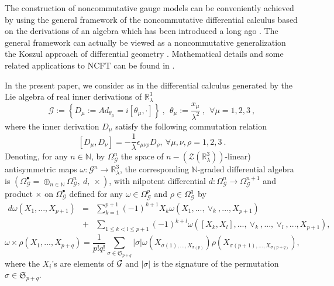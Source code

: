 \documentclass[a4paper,11pt,twoside]{article}
\numberwithin{equation}{section}
\theoremstyle{nonumberplain}
\newcounter{and}
\begin{document}
The construction of noncommutative gauge models can be conveniently achieved by using the general framework of the noncommutative differential calculus based on the derivations of an algebra which has been introduced a long ago \cite{mdv88-99}. The general framework can actually be viewed as a noncommutative generalization the Koszul approach of differential geometry \cite{koszul}. Mathematical details and some related applications to NCFT can be found in \cite{cgmw-20}. \par 
In the present paper, we consider as in \cite{gervitwal-13} the differential calculus generated by the Lie algebra of real inner derivations of $\mathbb{R}^3_\lambda$%
%
\begin{equation}
\mathcal{G} := \left\{D_\mu:= Ad_{\theta_\mu}= i \left[\theta_\mu, \cdot\right]\right\} \ ,  \ \ \theta_\mu := \frac{x_\mu}{\lambda^2} \ , \ \ \forall \mu = 1,2,3 \ , \label{inv-form-conn}
\end{equation}
%
where the inner derivation $D_\mu$ satisfy the following commutation relation%
%
\begin{equation}
\left[D_\mu,D_\nu\right] = -\frac{1}{\lambda} \epsilon_{\mu\nu\rho} D_\rho,\ \forall \mu,\nu,\rho = 1,2,3 \ . \label{Der}
\end{equation}
%
Denoting, for any $n\in\mathbb{N}$, by $\Omega^n_\mathcal{G}$ the space of $n-(\mathcal{Z}(\mathbb{R}^3_\lambda))$-linear) antisymmetric maps $\omega:\mathcal{G}^n\to\mathbb{R}^3_\lambda$, the corresponding $\mathbb{N}$-graded differential algebra is $(\Omega_\mathcal{G}^\bullet = \oplus_{n\in\mathbb{N}} \Omega^n_\mathcal{G},\ d,\ \times)$, with nilpotent differential $d:\Omega^n_\mathcal{G}\to\Omega^{n+1}_\mathcal{G}$ and product $\times$ on $\Omega_\mathcal{G}^\bullet$ defined for any $\omega\in\Omega^p_\mathcal{G}$ and $\rho\in\Omega^q_\mathcal{G}$ by
\begin{eqnarray}
d\omega(X_1,...,X_{p+1})&=&\sum_{k=1}^{p+1}(-1)^{k+1}X_k\omega(X_1,...,\vee_k,...,X_{p+1})\nonumber\\
&+&\sum_{1\le k<l\le p+1}(-1)^{k+l}\omega([X_k,X_l],...,\vee_k,...,\vee_l,...,X_{p+1})\label{differential},
\end{eqnarray}
%
\begin{equation}
\omega\times\rho(X_1,...,X_{p+q})=\frac{1}{p!q!}\sum_{\sigma\in\mathfrak{S}_{p+q}}\vert\sigma\vert\omega(X_{\sigma(1),...,X_{\sigma(p)}})
\rho(X_{\sigma(p+1),...,X_{\sigma(p+q)}})\label{innerformproduct},
\end{equation}
%
where the $X_i$'s are elements of ${\cal{G}}$ and $\vert\sigma\vert$ is the signature of the permutation $\sigma\in\mathfrak{S}_{p+q}$.\par 
\end{document}
